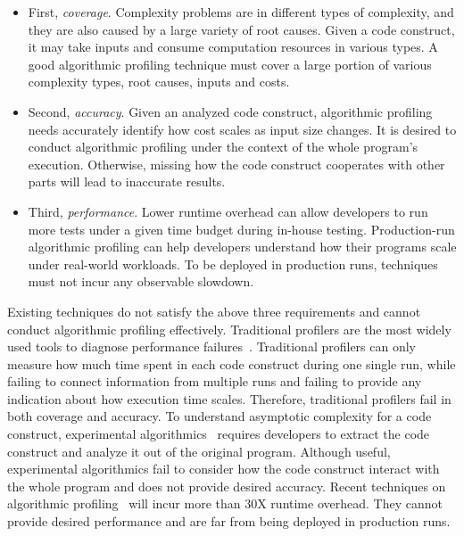 \begin{itemize}

\item First, \textit{coverage}. Complexity problems are in different types of complexity, 
and they are also caused by a large variety of root causes. 
Given a code construct, it may take inputs and 
consume computation resources in various types.
A good algorithmic profiling technique must cover a 
large portion of various complexity types, root causes, inputs and costs.


\item Second, \textit{accuracy}. 
Given an analyzed code construct,
algorithmic profiling needs accurately identify 
how cost scales as input size changes.
It is desired to conduct algorithmic profiling under the context of the whole program's execution. 
Otherwise, missing how the code construct cooperates with other parts will lead to inaccurate results. 

\item Third, \textit{performance}. 
Lower runtime overhead can allow developers to run more tests 
under a given time budget during in-house testing.
Production-run algorithmic profiling can help developers 
understand how their programs scale
under real-world workloads.
To be deployed in production runs, 
techniques must not incur any observable slowdown.


\end{itemize}

Existing techniques do not satisfy the above three requirements and 
cannot conduct algorithmic profiling effectively. 
Traditional profilers are the most widely used tools to 
diagnose performance failures~\cite{gprof,oprofile}. 
Traditional profilers can only measure how much time spent in each code construct during one single run, 
while failing to connect information from multiple runs 
and failing to provide any indication about how execution time scales.
Therefore, traditional profilers fail in both coverage and accuracy.  
To understand asymptotic complexity for a code construct,
experimental algorithmics~\cite{expalg1,expalg2,expalg3} requires developers to 
extract the code construct and analyze it out of the original program. 
Although useful,
experimental algorithmics fail to consider how the code 
construct interact with the whole program and does not provide desired accuracy. 
Recent techniques on algorithmic profiling~\cite{Aprof1,Aprof2,AlgoProf} will incur more than $30$X runtime overhead.
They cannot provide desired performance and are far from being deployed in production runs. 



